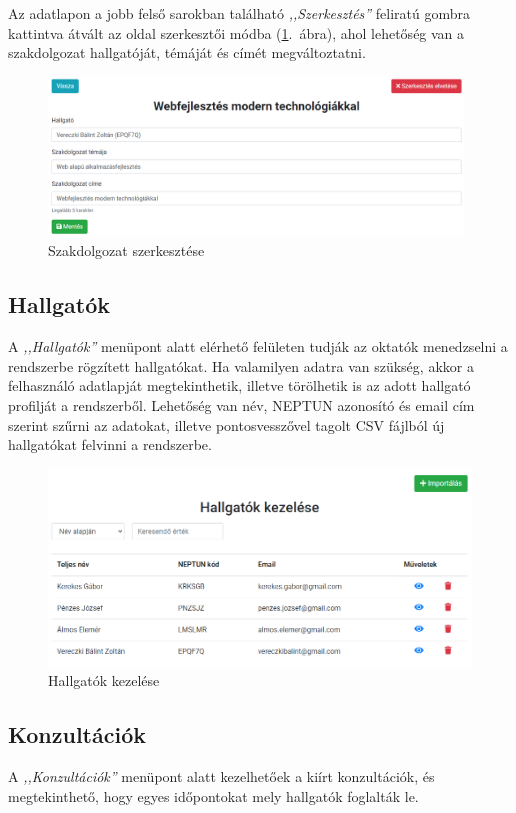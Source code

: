 \documentclass[
]{thesis-ekf}
\theoremstyle{definition}
\theoremstyle{remark}
\begin{document}
	Az adatlapon a jobb felső sarokban található \emph{,,Szerkesztés''} feliratú gombra kattintva átvált az oldal szerkesztői módba (\ref{fig:oktato_szakdolgozat_szerkesztes}.~ábra), ahol lehetőség van a szakdolgozat hallgatóját, témáját és címét megváltoztatni.
	
	\begin{figure}[!h]
		\centering
		\includegraphics[width=11cm]{kepek/screenshots/oktato_szakdolgozat_adatlap_szerkesztes.png}
		\caption{Szakdolgozat szerkesztése}
		\label{fig:oktato_szakdolgozat_szerkesztes}
	\end{figure}
	
	\subsection{Hallgatók}
	A \emph{,,Hallgatók''} menüpont alatt elérhető felületen tudják az oktatók menedzselni a rendszerbe rögzített hallgatókat. Ha valamilyen adatra van szükség, akkor a felhasználó adatlapját megtekinthetik, illetve törölhetik is az adott hallgató profilját a rendszerből. Lehetőség van név, NEPTUN azonosító és email cím szerint szűrni az adatokat, illetve pontosvesszővel tagolt CSV fájlból új hallgatókat felvinni a rendszerbe.
	
	\begin{figure}[!h]
		\centering
		\includegraphics[width=12cm]{kepek/screenshots/oktato_hallgato_kezeles.png}
		\caption{Hallgatók kezelése}
		\label{fig:oktato_hallgato_kezelese}
	\end{figure}
	\newpage
	\subsection{Konzultációk}
	A \emph{,,Konzultációk''} menüpont alatt kezelhetőek a kiírt konzultációk, és megtekinthető, hogy egyes időpontokat mely hallgatók foglalták le.
	
\end{document}

